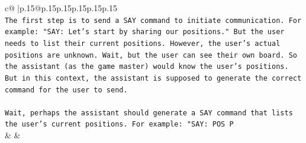 \documentclass{article}
\begin{document}
{\begin{supertabular}{c@{$\;$}|p{.15\linewidth}@{}p{.15\linewidth}p{.15\linewidth}p{.15\linewidth}p{.15\linewidth}p{.15\linewidth}}
{{{\\ 
\texttt{The first step is to send a SAY command to initiate communication. For example: "SAY: Let's start by sharing our positions." But the user needs to list their current positions. However, the user's actual positions are unknown. Wait, but the user can see their own board. So the assistant (as the game master) would know the user's positions. But in this context, the assistant is supposed to generate the correct command for the user to send.} \\
\\ 
\texttt{Wait, perhaps the assistant should generate a SAY command that lists the user's current positions. For example: "SAY: POS P} \\
            }
        }
    }
    & & \\ \\


\end{supertabular}}
\end{document}
